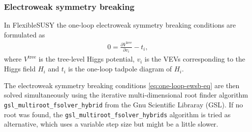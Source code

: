 \documentclass[final,3p,times,pdflatex]{elsarticle}
\newcommand{\fs}{FlexibleSUSY\xspace}
\newcommand{\code}[1]{\lstinline|#1|}  %
\begin{document}
\subsubsection{Electroweak symmetry breaking}
In \fs the one-loop electroweak symmetry breaking conditions are
formulated as
%
\begin{align}
  0 = \frac{\partial V^\text{tree}}{\partial v_i} - t_i,
  \label{eq:one-loop-ewsb-eq}
\end{align}
%
where $V^\text{tree}$ is the tree-level Higgs potential, $v_i$ is the
VEVs corresponding to the Higgs field $H_i$ and $t_i$ is the one-loop
tadpole diagram of $H_i$.

The electroweak symmetry breaking conditions
\eqref{eq:one-loop-ewsb-eq} are then solved simultaneously using the
iterative multi-dimensional root finder algorithm
\code{gsl_multiroot_fsolver_hybrid} from the Gnu Scientific Libraray
(GSL).  If no root was found, the \code{gsl_multiroot_fsolver_hybrids}
algorithm is tried as alternative, which uses a variable step size but
might be a little slower.
\end{document}
